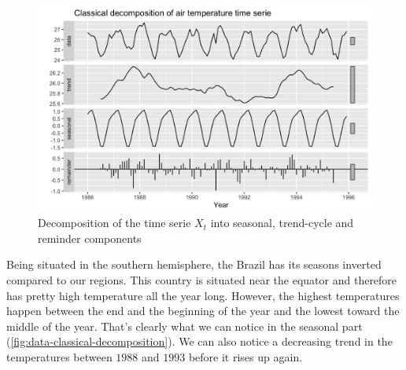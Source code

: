 \begin{figure}[H]
	\centering
	\includegraphics{figures/basic_analysis/time_serie_decomposition.png}
	\caption{Decomposition of the time serie $X_t$ into seasonal, trend-cycle and reminder components}
	\label{fig:data-classical-decomposition}
\end{figure}

Being situated in the southern hemisphere, the Brazil has its seasons inverted compared to our regions. 
This country is situated near the equator and therefore has pretty high temperature all the year long. However, the highest temperatures happen between the end and the beginning of the year and the lowest toward the middle of the year. That's clearly what we can notice in the seasonal part (\autoref{fig:data-classical-decomposition}). We can also notice a decreasing trend in the temperatures between $1988$ and $1993$ before it rises up again.